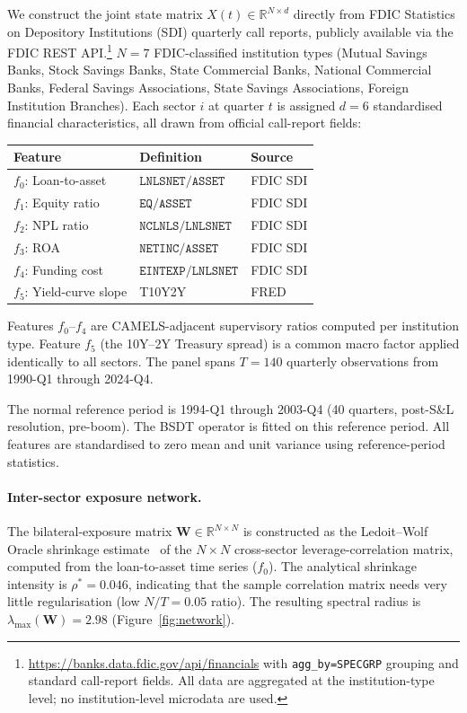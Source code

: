 \documentclass[11pt]{article}
\theoremstyle{definition}
\newcommand{\R}{\mathbb{R}}
\newcommand{\lmax}{\lambda_{\max}}
\begin{document}
We construct the joint state matrix $X(t) \in \R^{N \times d}$ directly from
FDIC Statistics on Depository Institutions (SDI) quarterly call reports,
publicly available via the FDIC REST API.\footnote{%
  \url{https://banks.data.fdic.gov/api/financials} with
  \texttt{agg\_by=SPECGRP} grouping and standard call-report fields.
  All data are aggregated at the institution-type level; no institution-level
  microdata are used.}
$N = 7$ FDIC-classified institution types (Mutual Savings Banks, Stock Savings
Banks, State Commercial Banks, National Commercial Banks, Federal Savings
Associations, State Savings Associations, Foreign Institution Branches).
Each sector $i$ at quarter $t$ is assigned $d = 6$ standardised financial
characteristics, all drawn from official call-report fields:
\begin{center}
\begin{tabular}{lll}
\toprule
Feature & Definition & Source \\
\midrule
$f_0$: Loan-to-asset & $\texttt{LNLSNET}/\texttt{ASSET}$ & FDIC SDI \\
$f_1$: Equity ratio & $\texttt{EQ}/\texttt{ASSET}$ & FDIC SDI \\
$f_2$: NPL ratio & $\texttt{NCLNLS}/\texttt{LNLSNET}$ & FDIC SDI \\
$f_3$: ROA & $\texttt{NETINC}/\texttt{ASSET}$ & FDIC SDI \\
$f_4$: Funding cost & $\texttt{EINTEXP}/\texttt{LNLSNET}$ & FDIC SDI \\
$f_5$: Yield-curve slope & T10Y2Y & FRED \\
\bottomrule
\end{tabular}
\end{center}
Features $f_0$--$f_4$ are CAMELS-adjacent supervisory ratios computed per
institution type.  Feature $f_5$ (the 10Y--2Y Treasury spread) is a common
macro factor applied identically to all sectors.  The panel spans
$T = 140$ quarterly observations from 1990-Q1 through 2024-Q4.

The normal reference period is 1994-Q1 through 2003-Q4 (40 quarters,
post-S\&L resolution, pre-boom).  The BSDT operator is fitted on this
reference period.  All features are standardised to zero mean and unit
variance using reference-period statistics.

\paragraph{Inter-sector exposure network.}
The bilateral-exposure matrix $\mathbf{W} \in \R^{N \times N}$ is constructed
as the Ledoit--Wolf Oracle shrinkage estimate~\citep{ledoit2004} of the
$N \times N$ cross-sector leverage-correlation matrix, computed from the
loan-to-asset time series ($f_0$).  The analytical shrinkage intensity is
$\rho^* = 0.046$, indicating that the sample correlation matrix needs
very little regularisation (low $N/T = 0.05$ ratio).  The resulting
spectral radius is $\lmax(\mathbf{W}) = 2.98$ (Figure~\ref{fig:network}).
\end{document}
